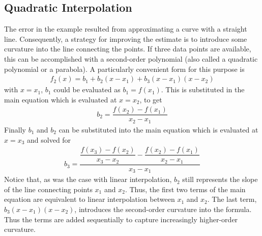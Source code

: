 \documentclass[book.tex]{subfiles}
\begin{document}
\subsection{Quadratic Interpolation}
The error in the example resulted from approximating a curve with a straight line. Consequently, a strategy for improving the estimate is to introduce some curvature into the line
connecting the points. If three data points are available, this can be accomplished with a second-order polynomial (also called a quadratic polynomial or a parabola). A particularly convenient form for this purpose is
\begin{align}
f_2(x) = b_1 + b_2(x-x_1) + b_3(x-x_1)(x-x_2)
\end{align}
with $x = x_1$, $b_1$ could be evaluated as $b_1 = f(x_1)$. This is substituted in the main equation which is evaluated at $x = x_2$, to get
\begin{align}
b_2 = \dfrac{f(x_2)-f(x_1)}{x_2-x_1}
\end{align}
Finally $b_1$ and $b_2$ can be substituted into the main equation which is evaluated at $x = x_3$ and solved for
\begin{align}
b_3 = \dfrac{\dfrac{f(x_3)-f(x_2)}{x_3 - x_2} - \dfrac{f(x_2)-f(x_1)}{x_2 - x_1}}{x_3-x_1}
\end{align}
Notice that, as was the case with linear interpolation, $b_2$ still represents the slope of the line connecting points $x_1$ and $x_2$. Thus, the first two terms of the main equation are equivalent to linear interpolation between $x_1$ and $x_2$. The last term, $b_3(x-x_1)(x-x_2)$, introduces the second-order curvature into the formula. Thus the terms are added sequentially to capture increasingly higher-order curvature.
\end{document}
